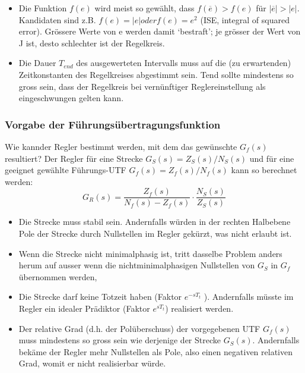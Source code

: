 \begin{itemize}
\item Die Funktion $f(e)$ wird meist so gewählt, dass $f(\overline{e}) > f(e)$ für $|\overline{e}| > |e|$.
Kandidaten sind z.B. $f(e) = |e| oder f(e) = e^2$ (ISE, integral of squared
error). Grössere Werte von e werden damit ‘bestraft’; je grösser der Wert von
J ist, desto schlechter ist der Regelkreis.
\item Die Dauer $T_{end}$ des ausgewerteten Intervalls muss auf die (zu erwartenden)
Zeitkonstanten des Regelkreises abgestimmt sein. Tend sollte mindestens so
gross sein, dass der Regelkreis bei vernünftiger Reglereinstellung als eingeschwungen
gelten kann.
\end{itemize}

\subsubsection{Vorgabe der Führungsübertragungsfunktion}

Wie kannder Regler bestimmt werden, mit dem das gewünschte $G_f(s)$ resultiert?
Der Regler für eine Strecke $G_S(s) = Z_S(s)/N_S(s)$ und für eine geeignet gewählte
Führungs-UTF $G_f(s) = Z_f(s)/N_f(s)$ kann so berechnet werden:
\begin{equation}
\boxed{G_R(s)=\frac{Z_f(s)}{N_f(s)-Z_f(s)}\cdot\frac{N_S(s)}{Z_S(s)}}
\end{equation}
\begin{itemize}
\item  Die Strecke muss stabil sein. Andernfalls würden in der rechten Halbebene
Pole der Strecke durch Nullstellen im Regler gekürzt, was nicht erlaubt ist.
\item  Wenn die Strecke nicht minimalphasig ist, tritt dasselbe Problem anders herum
auf ausser wenn die nichtminimalphasigen Nullstellen von $G_S$ in $G_f$
übernommen werden, 
\item  Die Strecke darf keine Totzeit haben (Faktor $e^{-sT_t}$ ). Andernfalls müsste im
Regler ein idealer Prädiktor (Faktor $e^{sT_t}$) realisiert werden.
\item  Der relative Grad (d.h. der Polüberschuss) der vorgegebenen UTF $G_f (s)$ muss
mindestens so gross sein wie derjenige der Strecke $G_S(s)$. Andernfalls bekäme
der Regler mehr Nullstellen als Pole, also einen negativen relativen Grad, womit
er nicht realisierbar würde.
\end{itemize}
